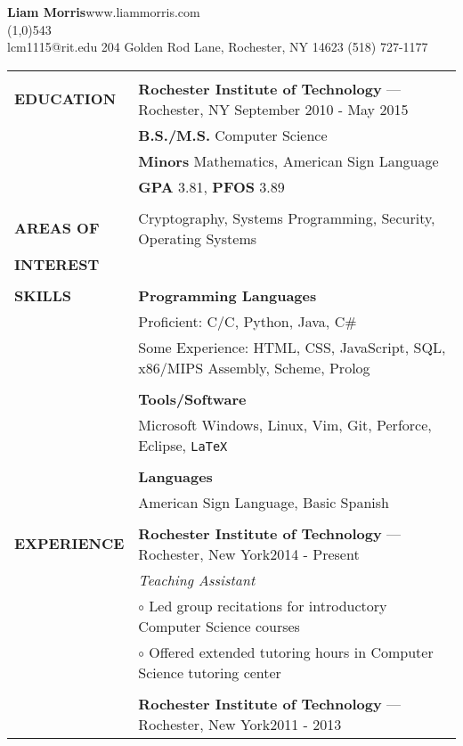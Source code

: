\documentclass[10pt,letterpaper]{article}
\newcommand{\CPP}{C\nolinebreak[4]\hspace{-.05em}\raisebox{.22ex}{\footnotesize\bf ++}}
\newcommand{\circbullet}{\hspace{10pt}$\circ$ }
\begin{document}
\raggedright

\textbf{\huge{Liam Morris}}\hfill www.liammorris.com\\
\vspace{-8pt}
\line(1,0){543}\\
lcm1115@rit.edu \hfill 204 Golden Rod Lane, Rochester, NY 14623 \hfill (518)
727-1177\\
\vspace{5pt}

\begin{tabular}{@{}lp{6.6in}}
&\\
\textbf{EDUCATION}
&\textbf{Rochester Institute of Technology} --- Rochester, NY \hfill September 2010 - May 2015\\
&\textbf{B.S./M.S.} Computer Science\\
&\textbf{Minors} Mathematics, American Sign Language\\
&\textbf{GPA} 3.81, \textbf{PFOS} 3.89\\
&\\
\textbf{AREAS OF}
&Cryptography, Systems Programming, Security, Operating Systems\\
\textbf{INTEREST}&\\
&\\
\textbf{SKILLS}
&\textbf{Programming Languages}\\
&Proficient: C/\CPP, Python, Java, C\#\\
&Some Experience: HTML, CSS, JavaScript, SQL, x86/MIPS Assembly, Scheme, Prolog\\
&\\
&\textbf{Tools/Software}\\
&Microsoft Windows, Linux, Vim, Git, Perforce, Eclipse, \texttt{\LaTeX}\\
&\\
&\textbf{Languages}\\
&American Sign Language, Basic Spanish\\
&\\
\textbf{EXPERIENCE}
&\textbf{Rochester Institute of Technology} --- Rochester, New York\hfill 2014 - Present\\
&\emph{Teaching Assistant}\\
&\circbullet Led group recitations for introductory Computer Science courses\\
&\circbullet Offered extended tutoring hours in Computer Science tutoring center\\
&\\
&\textbf{Rochester Institute of Technology} --- Rochester, New York\hfill 2011 - 2013\\

\end{tabular}
\end{document}

